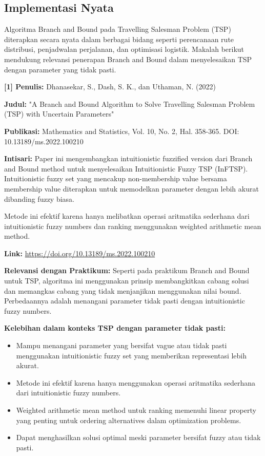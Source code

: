 \subsection{Implementasi Nyata}
Algoritma Branch and Bound pada Travelling Salesman Problem (TSP) diterapkan secara nyata dalam berbagai bidang seperti perencanaan rute distribusi, penjadwalan perjalanan, dan optimisasi logistik. Makalah berikut mendukung relevansi penerapan Branch and Bound dalam menyelesaikan TSP dengan parameter yang tidak pasti.

\vspace{1em}
\textbf{[1] Penulis:} Dhanasekar, S., Dash, S. K., dan Uthaman, N. (2022)

\textbf{Judul:} "A Branch and Bound Algorithm to Solve Travelling Salesman Problem (TSP) with Uncertain Parameters"

\textbf{Publikasi:} Mathematics and Statistics, Vol. 10, No. 2, Hal. 358-365. DOI: 10.13189/ms.2022.100210

\textbf{Intisari:} Paper ini mengembangkan intuitionistic fuzzified version dari Branch and Bound method untuk menyelesaikan Intuitionistic Fuzzy TSP (InFTSP). Intuitionistic fuzzy set yang mencakup non-membership value bersama membership value diterapkan untuk memodelkan parameter dengan lebih akurat dibanding fuzzy biasa.

Metode ini efektif karena hanya melibatkan operasi aritmatika sederhana dari intuitionistic fuzzy numbers dan ranking menggunakan weighted arithmetic mean method.

\textbf{Link:} \url{https://doi.org/10.13189/ms.2022.100210}

\vspace{1em}
\textbf{Relevansi dengan Praktikum:} Seperti pada praktikum Branch and Bound untuk TSP, algoritma ini menggunakan prinsip membangkitkan cabang solusi dan memangkas cabang yang tidak menjanjikan menggunakan nilai bound. Perbedaannya adalah menangani parameter tidak pasti dengan intuitionistic fuzzy numbers.

\vspace{1em}
\textbf{Kelebihan dalam konteks TSP dengan parameter tidak pasti:}
\begin{itemize}
    \item Mampu menangani parameter yang bersifat vague atau tidak pasti menggunakan intuitionistic fuzzy set yang memberikan representasi lebih akurat.
    \item Metode ini efektif karena hanya menggunakan operasi aritmatika sederhana dari intuitionistic fuzzy numbers.
    \item Weighted arithmetic mean method untuk ranking memenuhi linear property yang penting untuk ordering alternatives dalam optimization problems.
    \item Dapat menghasilkan solusi optimal meski parameter bersifat fuzzy atau tidak pasti.
\end{itemize}

